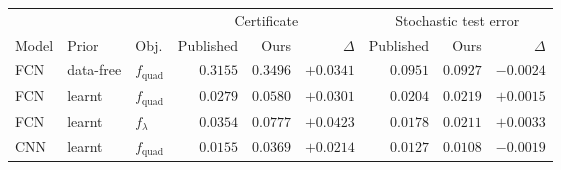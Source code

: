 \begin{tabular}{@{}lll rr r rr r@{}}
\toprule
& & & \multicolumn{3}{c}{Certificate} & \multicolumn{3}{c}{Stochastic test error} \\
\cmidrule(lr){4-6}\cmidrule(lr){7-9}
Model & Prior & Obj. & Published & Ours & $\Delta$ & Published & Ours & $\Delta$ \\
\midrule
FCN & data-free & $f_{\text{quad}}$ & $0.3155$ & $0.3496$ & $+0.0341$ & $0.0951$ & $0.0927$ & $-0.0024$ \\
FCN & learnt & $f_{\text{quad}}$ & $0.0279$ & $0.0580$ & $+0.0301$ & $0.0204$ & $0.0219$ & $+0.0015$ \\
FCN & learnt & $f_{\lambda}$ & $0.0354$ & $0.0777$ & $+0.0423$ & $0.0178$ & $0.0211$ & $+0.0033$ \\
CNN & learnt & $f_{\text{quad}}$ & $0.0155$ & $0.0369$ & $+0.0214$ & $0.0127$ & $0.0108$ & $-0.0019$ \\
\bottomrule
\end{tabular}
